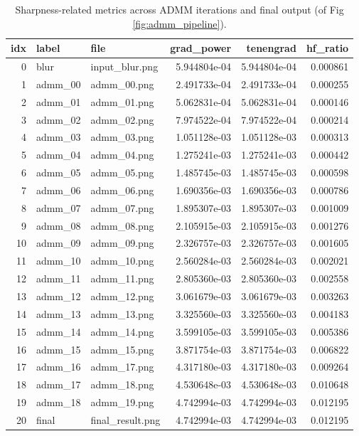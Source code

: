 \documentclass{article}
\theoremstyle{definition}
\begin{document}
\begin{table}[!h]
\centering
\caption{Sharpness-related metrics across ADMM iterations and final output (of Fig \ref{fig:admm_pipeline}).}
\label{tab:metrics_table}
\begin{tabular}{r l l r r r}
\toprule
\textbf{idx} & \textbf{label} & \textbf{file} & \textbf{grad\_power} & \textbf{tenengrad} & \textbf{hf\_ratio} \\
\midrule
0  & blur     & input\_blur.png     & 5.944804e-04 & 5.944804e-04 & 0.000861 \\
1  & admm\_00 & admm\_00.png        & 2.491733e-04 & 2.491733e-04 & 0.000255 \\
2  & admm\_01 & admm\_01.png        & 5.062831e-04 & 5.062831e-04 & 0.000146 \\
3  & admm\_02 & admm\_02.png        & 7.974522e-04 & 7.974522e-04 & 0.000214 \\
4  & admm\_03 & admm\_03.png        & 1.051128e-03 & 1.051128e-03 & 0.000313 \\
5  & admm\_04 & admm\_04.png        & 1.275241e-03 & 1.275241e-03 & 0.000442 \\
6  & admm\_05 & admm\_05.png        & 1.485745e-03 & 1.485745e-03 & 0.000598 \\
7  & admm\_06 & admm\_06.png        & 1.690356e-03 & 1.690356e-03 & 0.000786 \\
8  & admm\_07 & admm\_07.png        & 1.895307e-03 & 1.895307e-03 & 0.001009 \\
9  & admm\_08 & admm\_08.png        & 2.105915e-03 & 2.105915e-03 & 0.001276 \\
10 & admm\_09 & admm\_09.png        & 2.326757e-03 & 2.326757e-03 & 0.001605 \\
11 & admm\_10 & admm\_10.png        & 2.560284e-03 & 2.560284e-03 & 0.002021 \\
12 & admm\_11 & admm\_11.png        & 2.805360e-03 & 2.805360e-03 & 0.002558 \\
13 & admm\_12 & admm\_12.png        & 3.061679e-03 & 3.061679e-03 & 0.003263 \\
14 & admm\_13 & admm\_13.png        & 3.325560e-03 & 3.325560e-03 & 0.004183 \\
15 & admm\_14 & admm\_14.png        & 3.599105e-03 & 3.599105e-03 & 0.005386 \\
16 & admm\_15 & admm\_15.png        & 3.871754e-03 & 3.871754e-03 & 0.006822 \\
17 & admm\_16 & admm\_17.png        & 4.317180e-03 & 4.317180e-03 & 0.009264 \\
18 & admm\_17 & admm\_18.png        & 4.530648e-03 & 4.530648e-03 & 0.010648 \\
19 & admm\_18 & admm\_19.png        & 4.742994e-03 & 4.742994e-03 & 0.012195 \\
20 & final    & final\_result.png   & 4.742994e-03 & 4.742994e-03 & 0.012195 \\
\bottomrule
\end{tabular}
\end{table}
\end{document}
